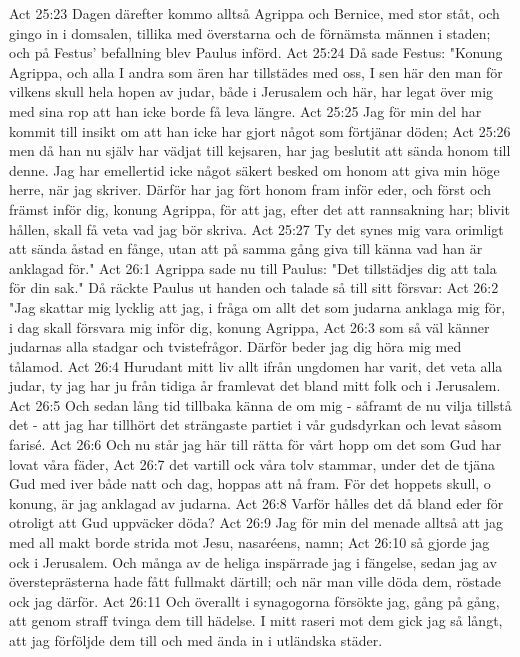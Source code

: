 Act 25:23  Dagen därefter kommo alltså Agrippa och Bernice, med stor ståt, och gingo in i domsalen, tillika med överstarna och de förnämsta männen i staden; och på Festus' befallning blev Paulus införd.
Act 25:24  Då sade Festus: "Konung Agrippa, och alla I andra som ären har tillstädes med oss, I sen här den man för vilkens skull hela hopen av judar, både i Jerusalem och här, har legat över mig med sina rop att han icke borde få leva längre.
Act 25:25  Jag för min del har kommit till insikt om att han icke har gjort något som förtjänar döden;
Act 25:26  men då han nu själv har vädjat till kejsaren, har jag beslutit att sända honom till denne. Jag har emellertid icke något säkert besked om honom att giva min höge herre, när jag skriver. Därför har jag fört honom fram inför eder, och först och främst inför dig, konung Agrippa, för att jag, efter det att rannsakning har; blivit hållen, skall få veta vad jag bör skriva.
Act 25:27  Ty det synes mig vara orimligt att sända åstad en fånge, utan att på samma gång giva till känna vad han är anklagad för."
Act 26:1  Agrippa sade nu till Paulus: "Det tillstädjes dig att tala för din sak." Då räckte Paulus ut handen och talade så till sitt försvar:
Act 26:2  "Jag skattar mig lycklig att jag, i fråga om allt det som judarna anklaga mig för, i dag skall försvara mig inför dig, konung Agrippa,
Act 26:3  som så väl känner judarnas alla stadgar och tvistefrågor. Därför beder jag dig höra mig med tålamod.
Act 26:4  Hurudant mitt liv allt ifrån ungdomen har varit, det veta alla judar, ty jag har ju från tidiga år framlevat det bland mitt folk och i Jerusalem.
Act 26:5  Och sedan lång tid tillbaka känna de om mig - såframt de nu vilja tillstå det - att jag har tillhört det strängaste partiet i vår gudsdyrkan och levat såsom farisé.
Act 26:6  Och nu står jag här till rätta för vårt hopp om det som Gud har lovat våra fäder,
Act 26:7  det vartill ock våra tolv stammar, under det de tjäna Gud med iver både natt och dag, hoppas att nå fram. För det hoppets skull, o konung, är jag anklagad av judarna.
Act 26:8  Varför hålles det då bland eder för otroligt att Gud uppväcker döda?
Act 26:9  Jag för min del menade alltså att jag med all makt borde strida mot Jesu, nasaréens, namn;
Act 26:10  så gjorde jag ock i Jerusalem. Och många av de heliga inspärrade jag i fängelse, sedan jag av översteprästerna hade fått fullmakt därtill; och när man ville döda dem, röstade ock jag därför.
Act 26:11  Och överallt i synagogorna försökte jag, gång på gång, att genom straff tvinga dem till hädelse. I mitt raseri mot dem gick jag så långt, att jag förföljde dem till och med ända in i utländska städer.
